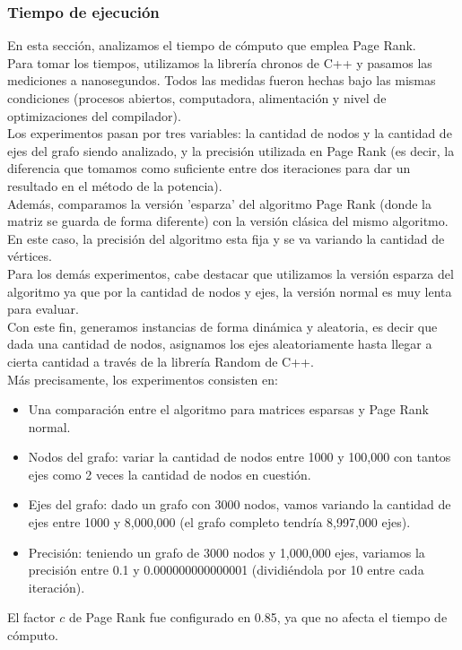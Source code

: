 \subsubsection{Tiempo de ejecución}

En esta sección, analizamos el tiempo de cómputo que emplea Page Rank.\\
Para tomar los tiempos, utilizamos la librería chronos de C++ y pasamos las mediciones a nanosegundos. Todos las medidas fueron hechas bajo las mismas condiciones (procesos abiertos, computadora, alimentación y nivel de optimizaciones del compilador).\\
Los experimentos pasan por tres variables: la cantidad de nodos y la cantidad de ejes del grafo siendo analizado, y la precisión utilizada en Page Rank (es decir, la diferencia que tomamos como suficiente entre dos iteraciones para dar un resultado en el método de la potencia).\\
Además, comparamos la versión 'esparza' del algoritmo Page Rank (donde la matriz se guarda de forma diferente) con la versión clásica del mismo algoritmo. En este caso, la precisión del algoritmo esta fija y se va variando la cantidad de vértices.\\
Para los demás experimentos, cabe destacar que utilizamos la versión esparza del algoritmo ya que por la cantidad de nodos y ejes, la versión normal es muy lenta para evaluar.\\
Con este fin, generamos instancias de forma dinámica y aleatoria, es decir que dada una cantidad de nodos, asignamos los ejes aleatoriamente hasta llegar a cierta cantidad a través de la librería Random de C++.\\
Más precisamente, los experimentos consisten en:
\begin{itemize}
    \item Una comparación entre el algoritmo para matrices esparsas y Page Rank normal.
    \item Nodos del grafo: variar la cantidad de nodos entre 1000 y 100,000 con tantos ejes como 2 veces la cantidad de nodos en cuestión.
    \item Ejes del grafo: dado un grafo con 3000 nodos, vamos variando la cantidad de ejes entre 1000 y 8,000,000 (el grafo completo tendría 8,997,000 ejes).
    \item Precisión: teniendo un grafo de 3000 nodos y 1,000,000 ejes, variamos la precisión entre 0.1 y 0.000000000000001 (dividiéndola por 10 entre cada iteración).
\end{itemize}
El factor $c$ de Page Rank fue configurado en 0.85, ya que no afecta el tiempo de cómputo.\\

